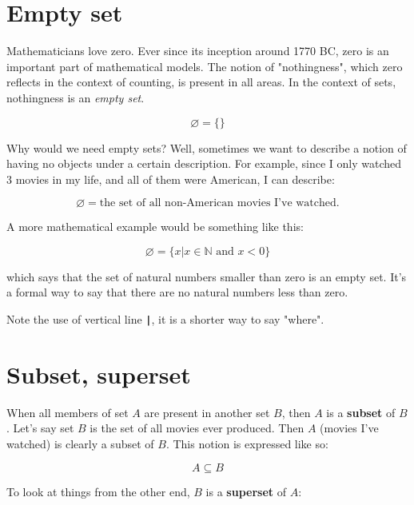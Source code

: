 \documentclass[a4paper, justified, notitlepage, sfsidenotes, notoc]{tufte-book}
\begin{document}
\section{Empty set}
\label{sec:org48e7535}

Mathematicians love zero. Ever since its inception around 1770 BC, zero is an important part of mathematical models. The notion of "nothingness", which zero reflects in the context of counting, is present in all areas. In the context of sets, nothingness is an \emph{empty set}.

\begin{equation}
\varnothing = \{\}
\end{equation}

Why would we need empty sets? Well, sometimes we want to describe a notion of having no objects under a certain description. For example, since I only watched 3 movies in my life, and all of them were American, I can describe:

\begin{equation}
\varnothing = \textrm{the set of all non-American movies I've watched}.
\end{equation}

A more mathematical example would be something like this:

\begin{equation}
\varnothing = \{x | x \in \mathbb{N} \textrm{ and } x < 0\}
\end{equation}

which says that the set of natural numbers smaller than zero is an empty set. It's a formal way to say that there are no natural numbers less than zero.

Note the use of vertical line \textbf{\texttt{|}}, it is a shorter way to say "where".

\section{Subset, superset}
\label{sec:org3f004ec}

When all members of set \(A\) are present in another set \(B\), then \(A\) is a \textbf{subset} of \(B\). Let's say set \(B\) is the set of all movies ever produced. Then \(A\) (movies I've watched) is clearly a subset of \(B\). This notion is expressed like so:

\begin{equation}
A \subseteq B
\end{equation}

To look at things from the other end, \(B\) is a \textbf{superset} of \(A\):
\end{document}
